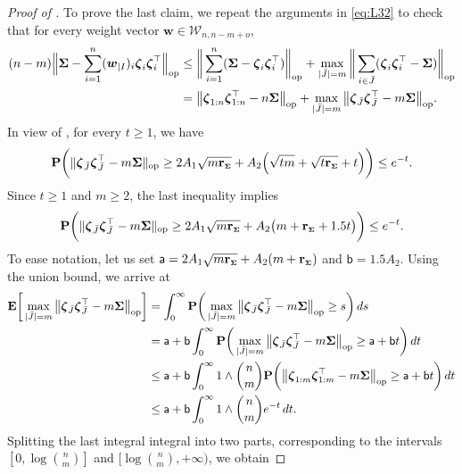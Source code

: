 \documentclass[aos,preprint,reqno]{imsart}
\newcommand\bzeta{\boldsymbol\zeta}
\newcommand\bSigma{\boldsymbol\Sigma}
\newcommand\bfE{\mathbf E}
\newcommand\bfP{\mathbf P}
\newcommand\bw{\boldsymbol w}
\newcommand\rSigma{\textbf{\textup{r}}_{\scriptscriptstyle\bSigma}}
\theoremstyle{plain}
\theoremstyle{remark}
\begin{document}
\begin{proof}[Proof of ]
	To prove the last claim, we repeat the arguments in \eqref{eq:L32} to check that
	for every weight vector $\bw\in \mathcal W_{n,n-m+o}$,
	\begin{align}
			(n-m) \Big\|
			\bSigma - \sum_{i=1}^n (\bw_{|I})_i\bzeta_i\bzeta_i^\top\Big\|_{\textup{op}}
			&\le  \bigg\|\sum_{i=1}^n(\bSigma-\bzeta_i\bzeta_i^\top)\bigg\|_{\textup{op}} + 
				\max_{|\bar J| = m} \bigg\|\sum_{i\in \bar J}(\bzeta_i\bzeta_i^\top - 
				\bSigma)\bigg\|_{\textup{op}}\\
			&=\big\|\bzeta_{1:n}\bzeta_{1:n}^\top-n\bSigma\big\|_{\textup{op}}
				+\max_{|\bar J| = m} \big\|\bzeta_{\bar J}\bzeta_{\bar J}^\top - 
				m\bSigma\big\|_{\textup{op}}.\label{eq:L81}
	\end{align}
	In view of , for every $t\ge 1$, we have 
	\begin{align}
		\bfP\bigg(\|\bzeta_{\bar J}\bzeta_{\bar J}^\top-m\bSigma\|_{\textup{op}} 	
		\ge 2A_1\sqrt{m\rSigma} + A_2\Big(\sqrt{t m} + \sqrt{t \rSigma}+ 
		t\Big)\bigg)\le e^{-t}.
	\end{align}
	Since $t\ge 1$ and $m\ge 2$, the last inequality implies
	\begin{align}
		\bfP\bigg(\|\bzeta_{\bar J}\bzeta_{\bar J}^\top-m\bSigma\|_{\textup{op}} 	
		\ge 2A_1\sqrt{m\rSigma} + A_2\big(m+\rSigma+1.5t\big)\bigg)\le e^{-t}.
	\end{align}
	To ease notation, let us set ${\sf a} =2A_1\sqrt{m\rSigma} + A_2(m +\rSigma)$ 
	and $\mathsf b = 1.5A_2$. Using the union bound, we 
	arrive at
	\begin{align}
		\bfE\bigg[\max_{|\bar J| = m} \big\|\bzeta_{\bar J}\bzeta_{\bar J}^\top - 
		m\bSigma\big\|_{\textup{op}} \bigg] 
		&= \int_0^\infty  \bfP\bigg(\max_{|\bar J| = m} \big\|\bzeta_{\bar J}
		\bzeta_{\bar J}^\top - m\bSigma\big\|_{\textup{op}} \ge s\bigg)\,ds\\
		&= \mathsf a + \mathsf b\int_0^\infty  \bfP\bigg(\max_{|\bar J| = m} 
		\big\|\bzeta_{\bar J}\bzeta_{\bar J}^\top - m\bSigma\big\|_{\textup{op}} 
		\ge \mathsf a + \mathsf b t\bigg)\,dt\\
		&\le \mathsf a + \mathsf b\int_0^\infty  1\wedge {n\choose m}\bfP
		\bigg(\big\|\bzeta_{1:m}\bzeta_{1:m}^\top - m\bSigma\big\|_{\textup{op}} 
		\ge \mathsf a + \mathsf b t\bigg)\,dt\\
		&\le \mathsf a +  \mathsf b\int_0^\infty  1\wedge {n\choose m}e^{-t}\,dt.
	\end{align}
	Splitting the last integral integral into two parts, corresponding to the intervals
	$[0,\log{n\choose m}]$ and $[\log {n\choose m},+\infty)$, we obtain

\end{proof}
\end{document}
